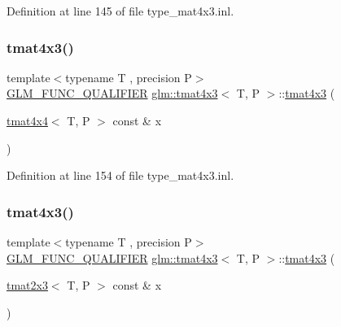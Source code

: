 Definition at line 145 of file type\+\_\+mat4x3.\+inl.

\mbox{\label{structglm_1_1tmat4x3_ad5011e7aaaeddf6ca91742217d07a8d2}} 
\subsubsection{\texorpdfstring{tmat4x3()}{tmat4x3()}\hspace{0.1cm}{\footnotesize\ttfamily [13/22]}}
{\footnotesize\ttfamily template$<$typename T , precision P$>$ \\
\mbox{\hyperlink{setup_8hpp_a33fdea6f91c5f834105f7415e2a64407}{G\+L\+M\+\_\+\+F\+U\+N\+C\+\_\+\+Q\+U\+A\+L\+I\+F\+I\+ER}} \mbox{\hyperlink{structglm_1_1tmat4x3}{glm\+::tmat4x3}}$<$ T, P $>$\+::\mbox{\hyperlink{structglm_1_1tmat4x3}{tmat4x3}} (\begin{DoxyParamCaption}\item[{\mbox{\hyperlink{structglm_1_1tmat4x4}{tmat4x4}}$<$ T, P $>$ const \&}]{x }\end{DoxyParamCaption})}



Definition at line 154 of file type\+\_\+mat4x3.\+inl.

\mbox{\label{structglm_1_1tmat4x3_ac73e3e89eac9d9d6b6f8dbb49f55a0e2}} 
\subsubsection{\texorpdfstring{tmat4x3()}{tmat4x3()}\hspace{0.1cm}{\footnotesize\ttfamily [14/22]}}
{\footnotesize\ttfamily template$<$typename T , precision P$>$ \\
\mbox{\hyperlink{setup_8hpp_a33fdea6f91c5f834105f7415e2a64407}{G\+L\+M\+\_\+\+F\+U\+N\+C\+\_\+\+Q\+U\+A\+L\+I\+F\+I\+ER}} \mbox{\hyperlink{structglm_1_1tmat4x3}{glm\+::tmat4x3}}$<$ T, P $>$\+::\mbox{\hyperlink{structglm_1_1tmat4x3}{tmat4x3}} (\begin{DoxyParamCaption}\item[{\mbox{\hyperlink{structglm_1_1tmat2x3}{tmat2x3}}$<$ T, P $>$ const \&}]{x }\end{DoxyParamCaption})}



